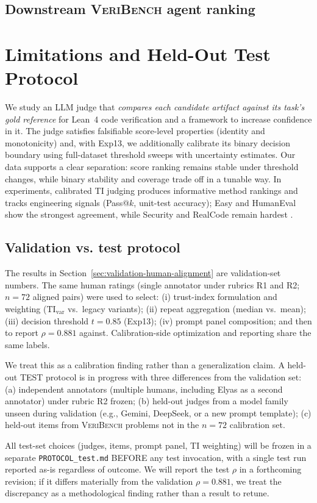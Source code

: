 \documentclass{article}
\begin{document}
\subsection{Downstream \textsc{VeriBench} agent ranking}
\section{Limitations and Held-Out Test Protocol}
We study an LLM judge that \emph{compares each candidate artifact against its task’s gold reference} for Lean~4 code verification and a framework to increase confidence in it.
The judge satisfies falsifiable score-level properties (identity and monotonicity) and, with Exp13, we additionally calibrate its binary decision boundary using full-dataset threshold sweeps with uncertainty estimates.
Our data supports a clear separation: score ranking remains stable under threshold changes, while binary stability and coverage trade off in a tunable way.
In experiments, calibrated TI judging produces informative method rankings and tracks engineering signals (Pass@$k$, unit-test accuracy); Easy and HumanEval show the strongest agreement, while Security and RealCode remain hardest \citep{chen2021evaluating}.

\subsection{Validation vs. test protocol}
The results in Section~\ref{sec:validation-human-alignment} are validation-set numbers.
The same human ratings (single annotator under rubrics R1 and R2; \(n=72\) aligned pairs) were used to select:
(i) trust-index formulation and weighting (\(\mathrm{TI}_{\mathrm{var}}\) vs.\ legacy variants);
(ii) repeat aggregation (median vs.\ mean);
(iii) decision threshold \(t=0.85\) (Exp13);
(iv) prompt panel composition;
and then to report \(\rho=0.881\) against.
Calibration-side optimization and reporting share the same labels.

We treat this as a calibration finding rather than a generalization claim.
A held-out TEST protocol is in progress with three differences from the validation set:
(a) independent annotators (multiple humans, including Elyas as a second annotator) under rubric R2 frozen;
(b) held-out judges from a model family unseen during validation (e.g., Gemini, DeepSeek, or a new prompt template);
(c) held-out items from \textsc{VeriBench} problems not in the \(n=72\) calibration set.

All test-set choices (judges, items, prompt panel, TI weighting) will be frozen in a separate \texttt{PROTOCOL\_test.md} BEFORE any test invocation, with a single test run reported as-is regardless of outcome.
We will report the test \(\rho\) in a forthcoming revision; if it differs materially from the validation \(\rho=0.881\), we treat the discrepancy as a methodological finding rather than a result to retune.
\end{document}
